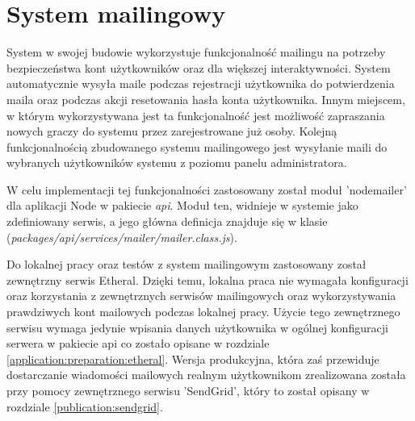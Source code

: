 \label{section:mailling}
\section{System mailingowy}
System w swojej budowie wykorzystuje funkcjonalność mailingu na potrzeby bezpieczeństwa kont użytkowników oraz dla większej interaktywności. System automatycznie wysyła maile podczas rejestracji użytkownika do potwierdzenia maila oraz podczas akcji resetowania hasła konta użytkownika. Innym miejscem, w którym wykorzystywana jest ta funkcjonalność jest możliwość zapraszania nowych graczy do systemu przez zarejestrowane już osoby. Kolejną funkcjonalnością zbudowanego systemu mailingowego jest wysyłanie maili do wybranych użytkowników systemu z poziomu panelu administratora.

W celu implementacji tej funkcjonalności zastosowany został moduł 'nodemailer' dla aplikacji Node w pakiecie \textit{api}. Moduł ten, widnieje w systemie jako zdefiniowany serwis, a jego główna definicja znajduje się w klasie (\textit{packages/api/services/mailer/mailer.class.js}).

Do lokalnej pracy oraz testów z system mailingowym zastosowany został zewnętrzny serwis Etheral. Dzięki temu, lokalna praca nie wymagała konfiguracji oraz korzystania z zewnętrznych serwisów mailingowych oraz wykorzystywania prawdziwych kont mailowych podczas lokalnej pracy. Użycie tego zewnętrznego serwisu wymaga jedynie wpisania danych użytkownika w ogólnej konfiguracji serwera w pakiecie api co zostało opisane w rozdziale \ref{application:preparation:etheral}. Wersja produkcyjna, która zaś przewiduje dostarczanie wiadomości mailowych realnym użytkownikom zrealizowana została przy pomocy zewnętrznego serwisu 'SendGrid', który to został opisany w rozdziale \ref{publication:sendgrid}.
